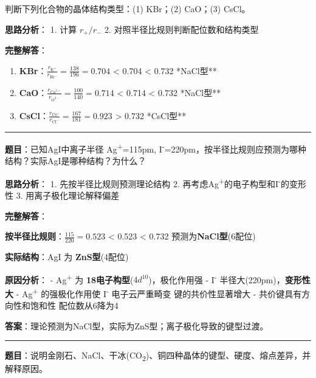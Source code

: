判断下列化合物的晶体结构类型：(1) KBr；(2) CaO；(3) CsCl。

\textbf{思路分析}：
1. 计算 \(r_+/r_-\)
2. 对照半径比规则判断配位数和结构类型

\textbf{完整解答}：

\begin{enumerate}
\def\labelenumi{(\arabic{enumi})}
\item
  \textbf{KBr}：\(\frac{r_{\mathrm{K^+}}}{r_{\mathrm{Br^-}}} = \frac{138}{196} = 0.704\)  \textless{} 0.704 \textless{} 0.732 \箭 **NaCl型**
\item
  \textbf{CaO}：\(\frac{r_{\mathrm{Ca^{2+}}}}{r_{\mathrm{O^{2-}}}} = \frac{100}{140} = 0.714\)  \textless{} 0.714 \textless{} 0.732 \箭 **NaCl型**
\item
  \textbf{CsCl}：\(\frac{r_{\mathrm{Cs^+}}}{r_{\mathrm{Cl^-}}} = \frac{167}{181} = 0.923\)  \textgreater{} 0.732 \箭 **CsCl型**
\end{enumerate}

\begin{center}\rule{0.5\linewidth}{0.5pt}\end{center}

\textbf{题目}：已知AgI中离子半径 Ag\textsuperscript{+}=115pm, I\textsuperscript{-}=220pm，按半径比规则应预测为哪种结构？实际AgI是哪种结构？为什么？

\textbf{思路分析}：
1. 先按半径比规则预测理论结构
2. 再考虑Ag\textsuperscript{+}的电子构型和I\textsuperscript{-}的变形性
3. 用离子极化理论解释偏差

\textbf{完整解答}：

\textbf{按半径比规则}：\(\frac{115}{220} = 0.523\)  \textless{} 0.523 \textless{} 0.732 \箭 预测为\textbf{NaCl型}(6配位)

\textbf{实际结构}：AgI 为 \textbf{ZnS型}(4配位)

\textbf{原因分析}：
- Ag\textsuperscript{+} 为 \textbf{18电子构型}(\(4d^{10}\))，极化作用强
- I\textsuperscript{-} 半径大(220pm)，\textbf{变形性大}
- Ag\textsuperscript{+} 的强极化作用使 I\textsuperscript{-} 电子云严重畸变 \箭 键的共价性显著增大
- 共价键具有方向性和饱和性 \箭 配位数从6降为4

\textbf{答案}：理论预测为NaCl型，实际为ZnS型；离子极化导致的键型过渡。

\begin{center}\rule{0.5\linewidth}{0.5pt}\end{center}

\textbf{题目}：说明金刚石、NaCl、干冰(CO\textsubscript{2})、铜四种晶体的键型、硬度、熔点差异，并解释原因。


